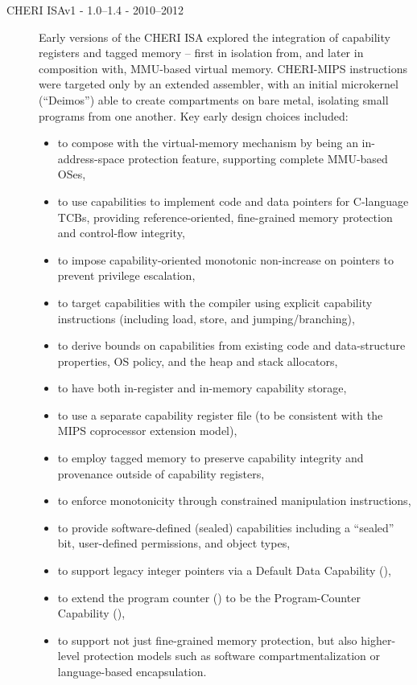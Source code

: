 \begin{description}
\item[CHERI ISAv1 - 1.0--1.4 - 2010--2012]
  Early versions of the CHERI ISA explored the integration of capability
  registers and tagged memory -- first in isolation from, and later in
  composition with, MMU-based virtual memory.
  CHERI-MIPS instructions were targeted only by an extended assembler, with an
  initial microkernel (``Deimos'') able to create compartments on bare metal,
  isolating small programs from one another.
  Key early design choices included:
  \begin{itemize}
  \item to compose with the virtual-memory mechanism by being an
    in-address-space protection feature, supporting complete MMU-based OSes,
  \item to use capabilities to implement code and data pointers for C-language
    TCBs, providing reference-oriented, fine-grained memory protection and
    control-flow integrity,
  \item to impose capability-oriented monotonic non-increase on pointers to
    prevent privilege escalation,
  \item to target capabilities with the compiler using explicit capability
    instructions (including load, store, and jumping/branching),
  \item to derive bounds on capabilities from existing code and data-structure
    properties, OS policy, and the heap and stack allocators,
  \item to have both in-register and in-memory capability storage,
  \item to use a separate capability register file (to be consistent with the
    MIPS coprocessor extension model),
  \item to employ tagged memory to preserve capability integrity and
    provenance outside of capability registers,
  \item to enforce monotonicity through constrained manipulation instructions,
  \item to provide software-defined (sealed) capabilities including a
    ``sealed'' bit, user-defined permissions, and object types,
  \item to support legacy integer pointers via a Default Data Capability
    (\DDC{}),
  \item to extend the program counter (\PC{}) to be the Program-Counter
    Capability (\PCC{}),
  \item to support not just fine-grained memory protection, but also
    higher-level protection models such as software compartmentalization or
    language-based encapsulation.
  \end{itemize}


\end{description}
